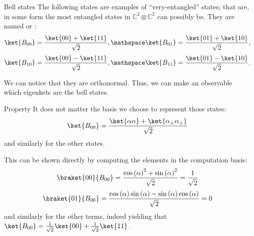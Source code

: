 \documentclass[a4paper]{article}
\begin{document}
\begin{parag}{Bell states}
    The following states are examples of ``very-entangled'' states; that are, in some form the most entangled states in $\mathbb{C}^2 \otimes\mathbb{C}^2$ can possibly be. They are named  or : 
    \[\ket{B_{00}} = \frac{\ket{00} + \ket{11}}{\sqrt{2}}, \mathspace \ket{B_{01}} = \frac{\ket{01} + \ket{10}}{\sqrt{2}},\] 
    \[\ket{B_{10}} = \frac{\ket{00} - \ket{11}}{\sqrt{2}}, \mathspace \ket{B_{11}} = \frac{\ket{01} - \ket{10}}{\sqrt{2}}.\]
    
    We can notice that they are orthonormal. Thus, we can make an observable which eigenkets are the bell states.

    \begin{subparag}{Property}
        It does not matter the basis we choose to represent those states: 
        \[\ket{B_{00}} = \frac{\ket{\alpha \alpha} + \ket{\alpha_{\perp} \alpha_{\perp}}}{\sqrt{2}}\]
        and similarly for the other states.

        This can be shown directly by computing the elements in the computation basis: 
        \[\braket{00}{B_{00}} = \frac{\cos\left(\alpha\right)^2 + \sin\left(\alpha\right)^2}{\sqrt{2}} = \frac{1}{\sqrt{2}}\] 
        \[\braket{01}{B_{00}} = \frac{\cos\left(\alpha\right)\sin\left(\alpha\right) - \sin\left(\alpha\right)\cos\left(\alpha\right)}{\sqrt{2}} = 0\]
        and similarly for the other terms, indeed yielding that $\ket{B_{00}} = \frac{1}{\sqrt{2}}\ket{00} + \frac{1}{\sqrt{2}}\ket{11}$.
    \end{subparag}
\end{parag}
\end{document}
